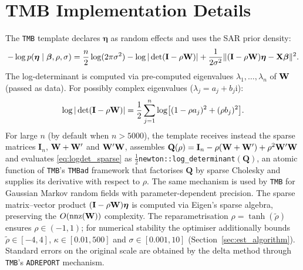 \section{TMB Implementation Details}\label{app:tmb}

The \texttt{TMB} template declares $\boldsymbol{\eta}$ as random effects and uses the SAR prior density:
\[
  -\log p(\boldsymbol{\eta}\mid\boldsymbol{\beta},\rho,\sigma) = \frac{n}{2}\log(2\pi\sigma^2) - \log|\det(\mathbf{I}-\rho\mathbf{W})| + \frac{1}{2\sigma^2}\|(\mathbf{I}-\rho\mathbf{W})\boldsymbol{\eta} - \mathbf{X}\boldsymbol{\beta}\|^2.
\]
The log-determinant is computed via pre-computed eigenvalues $\lambda_1,\ldots,\lambda_n$ of $\mathbf{W}$ (passed as data).
For possibly complex eigenvalues ($\lambda_j = a_j + b_j\mathrm{i}$):
\[
  \log|\det(\mathbf{I}-\rho\mathbf{W})| = \frac{1}{2}\sum_{j=1}^n \log\bigl[(1-\rho a_j)^2 + (\rho b_j)^2\bigr].
\]
For large $n$ (by default when $n > 5000$), the template receives instead the sparse matrices $\mathbf{I}_n$, $\mathbf{W}+\mathbf{W}'$ and $\mathbf{W}'\mathbf{W}$, assembles $\mathbf{Q}(\rho) = \mathbf{I}_n - \rho(\mathbf{W}+\mathbf{W}') + \rho^2\mathbf{W}'\mathbf{W}$ and evaluates \eqref{eq:logdet_sparse} as $\tfrac12$\texttt{newton::log\_determinant}$(\mathbf{Q})$, an atomic function of \texttt{TMB}'s \texttt{TMBad} framework that factorises $\mathbf{Q}$ by sparse Cholesky and supplies its derivative with respect to $\rho$.
The same mechanism is used by \texttt{TMB} for Gaussian Markov random fields with parameter-dependent precision.
The sparse matrix--vector product $(\mathbf{I}-\rho\mathbf{W})\boldsymbol{\eta}$ is computed via Eigen's sparse algebra, preserving the $O(\mathrm{nnz}(\mathbf{W}))$ complexity.
The reparametrisation $\rho = \tanh(\tilde{\rho})$ ensures $\rho \in (-1,1)$; for numerical stability the optimiser additionally bounds $\tilde\rho\in[-4,4]$, $\kappa\in[0.01,500]$ and $\sigma\in[0.001,10]$ (Section~\ref{sec:est_algorithm}).
Standard errors on the original scale are obtained by the delta method through \texttt{TMB}'s \texttt{ADREPORT} mechanism.


